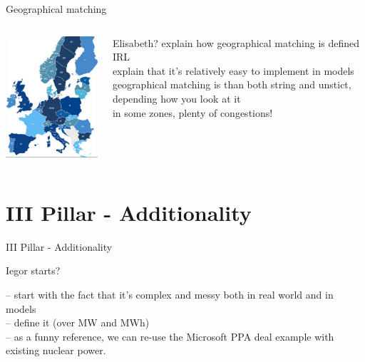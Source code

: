 \begin{frame}{Geographical matching}
\begin{columns}
	\begin{column}{0.4\textwidth}
		\includegraphics[width=5cm, clip, trim={0 0.1cm 0 0}]{images/biding_zones_eu.png}
	\end{column}
	\begin{column}{0.6\textwidth}
		Elisabeth?
		explain how geographical matching is defined IRL\\
		explain that it's relatively easy to implement in models\\
		geographical matching is than both string and unstict, depending how you look at it\\
		in some zones, plenty of congestions!\\
	\end{column}
\end{columns}
\end{frame}

\section{III Pillar - Additionality}
\begin{frame}{III Pillar - Additionality}

  Iegor starts? 

  -- start with the fact that it's complex and messy both in real world and in models\\
  -- define it (over MW and MWh)\\
  -- as a funny reference, we can re-use the Microsoft PPA deal example with existing nuclear power.

\end{frame}


